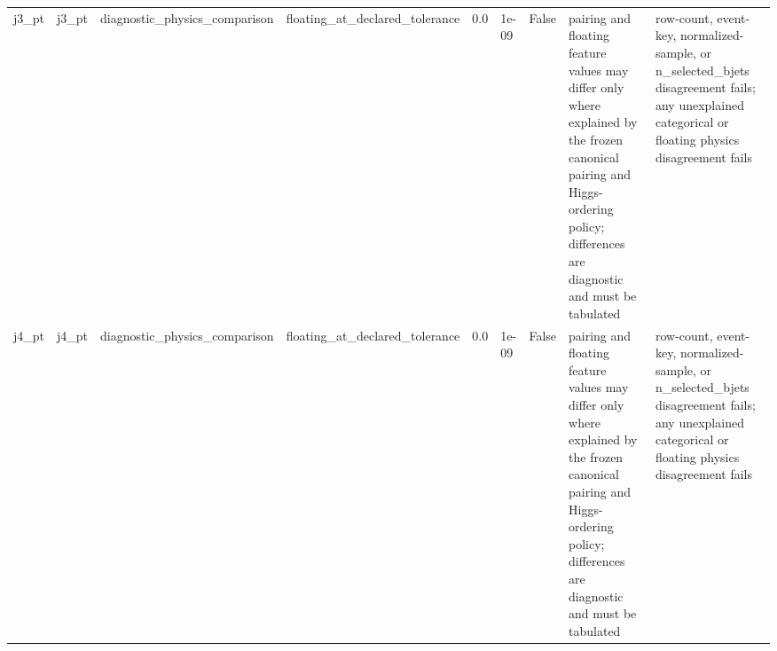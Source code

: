 \begin{tabular}{lllllllll}
j3\_pt & j3\_pt & diagnostic\_physics\_comparison & floating\_at\_declared\_tolerance & 0.0 & 1e-09 & False & pairing and floating feature values may differ only where explained by the frozen canonical pairing and Higgs-ordering policy; differences are diagnostic and must be tabulated & row-count, event-key, normalized-sample, or n\_selected\_bjets disagreement fails; any unexplained categorical or floating physics disagreement fails \\
j4\_pt & j4\_pt & diagnostic\_physics\_comparison & floating\_at\_declared\_tolerance & 0.0 & 1e-09 & False & pairing and floating feature values may differ only where explained by the frozen canonical pairing and Higgs-ordering policy; differences are diagnostic and must be tabulated & row-count, event-key, normalized-sample, or n\_selected\_bjets disagreement fails; any unexplained categorical or floating physics disagreement fails \\
\bottomrule
\end{tabular}
